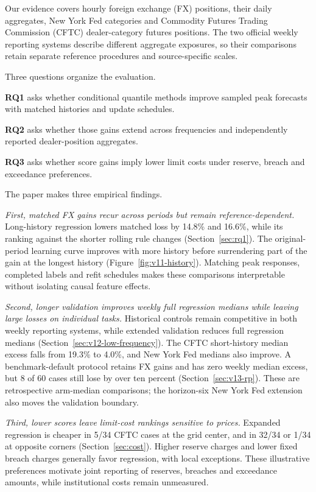 \documentclass[11pt,a4paper]{article}
\begin{document}
Our evidence covers hourly foreign exchange (FX) positions, their daily aggregates, New York Fed categories and Commodity Futures Trading Commission (CFTC) dealer-category futures positions. The two official weekly reporting systems describe different aggregate exposures, so their comparisons retain separate reference procedures and source-specific scales.

Three questions organize the evaluation.

\textbf{RQ1} asks whether conditional quantile methods improve sampled peak forecasts with matched histories and update schedules.

\textbf{RQ2} asks whether those gains extend across frequencies and independently reported dealer-position aggregates.

\textbf{RQ3} asks whether score gains imply lower limit costs under reserve, breach and exceedance preferences.

The paper makes three empirical findings.

\textit{First, matched FX gains recur across periods but remain reference-dependent.} Long-history regression lowers matched loss by 14.8\% and 16.6\%, while its ranking against the shorter rolling rule changes (Section~\ref{sec:rq1}). The original-period learning curve improves with more history before surrendering part of the gain at the longest history (Figure~\ref{fig:v11-history}). Matching peak responses, completed labels and refit schedules makes these comparisons interpretable without isolating causal feature effects.

\textit{Second, longer validation improves weekly full regression medians while leaving large losses on individual tasks.} Historical controls remain competitive in both weekly reporting systems, while extended validation reduces full regression medians (Section~\ref{sec:v12-low-frequency}). The CFTC short-history median excess falls from 19.3\% to 4.0\%, and New York Fed medians also improve. A benchmark-default protocol retains FX gains and has zero weekly median excess, but 8 of 60 cases still lose by over ten percent (Section~\ref{sec:v13-rp}). These are retrospective arm-median comparisons; the horizon-six New York Fed extension also moves the validation boundary.

\textit{Third, lower scores leave limit-cost rankings sensitive to prices.} Expanded regression is cheaper in 5/34 CFTC cases at the grid center, and in 32/34 or 1/34 at opposite corners (Section~\ref{sec:cost}). Higher reserve charges and lower fixed breach charges generally favor regression, with local exceptions. These illustrative preferences motivate joint reporting of reserves, breaches and exceedance amounts, while institutional costs remain unmeasured.
\end{document}
